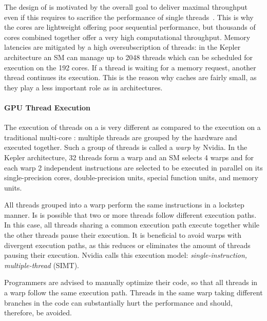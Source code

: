 The design of \GPUs is motivated by the overall goal to deliver maximal throughput even if this requires to sacrifice the performance of single threads~\cite{GarlandK10}.
This is why the \GPU cores are lightweight offering poor sequential performance, but thousands of cores combined together offer a very high computational throughput.
Memory latencies are mitigated by a high oversubscription of threads:
in the Kepler architecture an SM can manage up to 2048 threads which can be scheduled for execution on the 192 cores.
If a thread is waiting for a memory request, another thread continues its execution.
This is the reason why caches are fairly small, as they play a less important role as in \CPU architectures.

\paragraph{GPU Thread Execution}
The execution of threads on a \GPU is very different as compared to the execution on a traditional multi-core \CPU:
multiple threads are grouped by the hardware and executed together.
Such a group of threads is called a \emph{warp} by Nvidia.
In the Kepler architecture, 32 threads form a warp and an SM selects 4 warps and for each warp 2 independent instructions are selected to be executed in parallel on its single-precision cores, double-precision units, special function units, and memory units.

All threads grouped into a warp perform the same instructions in a lockstep manner.
Is is possible that two or more threads follow different execution paths.
In this case, all threads sharing a common execution path execute together while the other threads pause their execution.
It is beneficial to avoid warps with divergent execution paths, as this reduces or eliminates the amount of threads pausing their execution.
Nvidia calls this execution model: \emph{single-instruction, multiple-thread} (SIMT).

Programmers are advised to manually optimize their code, so that all threads in a warp follow the same execution path.
Threads in the same warp taking different branches in the code can substantially hurt the performance and should, therefore, be avoided.


